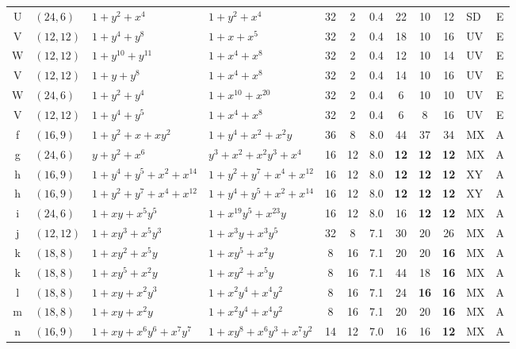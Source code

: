 \begin{table}[t]
\begin{tabular*}{\textwidth}{@{\extracolsep{\fill}}clllcccccclc}
U & $(24,6)$ & $1{+}y^{2}{+}x^{4}$ & $1{+}y^{2}{+}x^{4}$ & 32 & 2 & 0.4 & 22 & 10 & 12 & SD & E \\
V & $(12,12)$ & $1{+}y^{4}{+}y^{8}$ & $1{+}x{+}x^{5}$ & 32 & 2 & 0.4 & 18 & 10 & 16 & UV & E \\
W & $(12,12)$ & $1{+}y^{10}{+}y^{11}$ & $1{+}x^{4}{+}x^{8}$ & 32 & 2 & 0.4 & 12 & 10 & 14 & UV & E \\
V & $(12,12)$ & $1{+}y{+}y^{8}$ & $1{+}x^{4}{+}x^{8}$ & 32 & 2 & 0.4 & 14 & 10 & 16 & UV & E \\
W & $(24,6)$ & $1{+}y^{2}{+}y^{4}$ & $1{+}x^{10}{+}x^{20}$ & 32 & 2 & 0.4 & 6 & 10 & 10 & UV & E \\
V & $(12,12)$ & $1{+}y^{4}{+}y^{5}$ & $1{+}x^{4}{+}x^{8}$ & 32 & 2 & 0.4 & 6 & 8 & 16 & UV & E \\
\midrule
f & $(16,9)$ & $1{+}y^{2}{+}x{+}xy^{2}$ & $1{+}y^{4}{+}x^{2}{+}x^{2}y$ & 36 & 8 & 8.0 & 44 & 37 & 34 & MX & A \\
g & $(24,6)$ & $y{+}y^{2}{+}x^{6}$ & $y^{3}{+}x^{2}{+}x^{2}y^{3}{+}x^{4}$ & 16 & 12 & 8.0 & \textbf{12} & \textbf{12} & \textbf{12} & MX & A \\
h & $(16,9)$ & $1{+}y^{4}{+}y^{5}{+}x^{2}{+}x^{14}$ & $1{+}y^{2}{+}y^{7}{+}x^{4}{+}x^{12}$ & 16 & 12 & 8.0 & \textbf{12} & \textbf{12} & \textbf{12} & XY & A \\
h & $(16,9)$ & $1{+}y^{2}{+}y^{7}{+}x^{4}{+}x^{12}$ & $1{+}y^{4}{+}y^{5}{+}x^{2}{+}x^{14}$ & 16 & 12 & 8.0 & \textbf{12} & \textbf{12} & \textbf{12} & XY & A \\
i & $(24,6)$ & $1{+}xy{+}x^{5}y^{5}$ & $1{+}x^{19}y^{5}{+}x^{23}y$ & 16 & 12 & 8.0 & 16 & \textbf{12} & \textbf{12} & MX & A \\
j & $(12,12)$ & $1{+}xy^{3}{+}x^{5}y^{3}$ & $1{+}x^{3}y{+}x^{3}y^{5}$ & 32 & 8 & 7.1 & 30 & 20 & 26 & MX & A \\
k & $(18,8)$ & $1{+}xy^{2}{+}x^{5}y$ & $1{+}xy^{5}{+}x^{2}y$ & 8 & 16 & 7.1 & 20 & 20 & \textbf{16} & MX & A \\
k & $(18,8)$ & $1{+}xy^{5}{+}x^{2}y$ & $1{+}xy^{2}{+}x^{5}y$ & 8 & 16 & 7.1 & 44 & 18 & \textbf{16} & MX & A \\
l & $(18,8)$ & $1{+}xy{+}x^{2}y^{3}$ & $1{+}x^{2}y^{4}{+}x^{4}y^{2}$ & 8 & 16 & 7.1 & 24 & \textbf{16} & \textbf{16} & MX & A \\
m & $(18,8)$ & $1{+}xy{+}x^{2}y$ & $1{+}x^{2}y^{4}{+}x^{4}y^{2}$ & 8 & 16 & 7.1 & 20 & 20 & \textbf{16} & MX & A \\
n & $(16,9)$ & $1{+}xy{+}x^{6}y^{6}{+}x^{7}y^{7}$ & $1{+}xy^{8}{+}x^{6}y^{3}{+}x^{7}y^{2}$ & 14 & 12 & 7.0 & 16 & 16 & \textbf{12} & MX & A \\

\end{tabular*}
\end{table}

